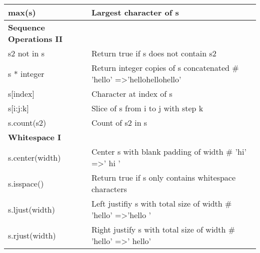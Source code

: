 \documentclass[a4paper,11pt]{book}
\numberwithin{figure}{chapter}
\numberwithin{table}{chapter}
\begin{document}
\begin{appendices}
\begin{table}[!htbp]
\begin{tabular}{lp{12cm}}
max(s)                   & Largest character of s                                                                                                                          \\ \midrule 
\textbf{Sequence Operations II}   &                                                                                                                                                 \\ \midrule
s2 not in s              & Return true if s does not contain s2                                                                                                            \\
s * integer              & Return integer copies of s concatenated \# 'hello' =\textgreater 'hellohellohello'                                                              \\
s{[}index{]}             & Character at index of s                                                                                                                         \\
s{[}i:j:k{]}             & Slice of s from i to j with step k                                                                                                              \\
s.count(s2)              & Count of s2 in s                                                                                                                                \\ \midrule
\textbf{Whitespace I}             &                                                                                                                                                 \\ \midrule
s.center(width)          & Center s with blank padding of width \# 'hi' =\textgreater ' hi '                                                                               \\
s.isspace()              & Return true if s only contains whitespace characters                                                                                            \\
s.ljust(width)           & Left justifiy s with total size of width \# 'hello' =\textgreater 'hello '                                                                      \\
s.rjust(width)           & Right justify s with total size of width \# 'hello' =\textgreater ' hello'                                                                      \\

\end{tabular}
\end{table}
\end{appendices}
\end{document}

